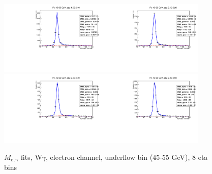 \begin{figure}[htb]
\begin{center}
   \includegraphics[width=0.45\textwidth]{../figs/figs_v11/ELECTRON_WGamma/EtoGammaFits/sa_hZmass_h_Data_EtoGamma_Enr_ENDCAP_pt45to55_ieta0_noWMtCut.pdf}\includegraphics[width=0.45\textwidth]{../figs/figs_v11/ELECTRON_WGamma/EtoGammaFits/sa_hZmass_h_Data_EtoGamma_Enr_ENDCAP_pt45to55_ieta1_noWMtCut.pdf}\\
   \includegraphics[width=0.45\textwidth]{../figs/figs_v11/ELECTRON_WGamma/EtoGammaFits/sa_hZmass_h_Data_EtoGamma_Enr_ENDCAP_pt45to55_ieta2_noWMtCut.pdf}\includegraphics[width=0.45\textwidth]{../figs/figs_v11/ELECTRON_WGamma/EtoGammaFits/sa_hZmass_h_Data_EtoGamma_Enr_ENDCAP_pt45to55_ieta3_noWMtCut.pdf}\\
  \label{fig:etogFits_45to55}
  \caption{$M_{e,\gamma}$ fits, W$\gamma$, electron channel, underflow bin (45-55 GeV), 8 eta bins}
  \end{center}
\end{figure}

